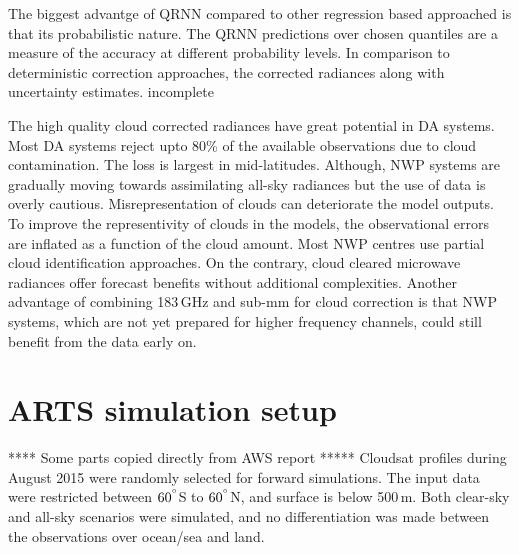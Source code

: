 \documentclass[amt]{copernicus}
\newcommand{\todo}[1]{{\color{red} #1}}
\begin{document}
The biggest advantge of QRNN compared to other regression based approached is that its probabilistic nature. The QRNN predictions over chosen quantiles are a measure of the accuracy at different probability levels. In comparison to deterministic correction approaches, the corrected radiances along with uncertainty estimates. \todo{incomplete}  


The high quality cloud corrected radiances have great potential in DA systems. Most DA systems reject upto 80\% of the available observations due to cloud contamination. The loss is largest in mid-latitudes. Although, NWP systems are gradually moving towards assimilating all-sky radiances but the use of data is overly cautious. Misrepresentation of clouds can deteriorate the model outputs. To improve the representivity of clouds in the models, the observational errors are inflated as a function of the cloud amount. Most NWP centres use partial cloud identification approaches. On the contrary, cloud cleared microwave radiances offer forecast benefits without additional complexities. Another advantage of combining 183\,GHz and sub-mm for cloud correction is that NWP systems, which are not yet prepared for higher frequency channels, could still benefit from the data early on. 













\appendix
\section{ARTS simulation setup}    %
\label{appendix:ARTS_setup}
%
**** Some parts copied directly from AWS report *****
Cloudsat profiles during August 2015 were randomly selected for forward simulations. The input data were restricted between $60^{^{\circ}}$S to $60^{^{\circ}}$N, and surface is below 500\,m. Both clear-sky and all-sky scenarios were simulated, and no differentiation was made between the observations over ocean/sea and land. 
\end{document}
